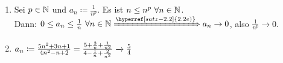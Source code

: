 \begin{beispiele*}
	\begin{enumerate}
		\item Sei $p \in \mathbb{N}$ und $a_{n} \coloneqq \frac{1}{n^{p}}$. Es ist $n \leq n^{p} ~\forall n \in \mathbb{N}$. \\
			Dann: $0 \leq a_{n} \leq \frac{1}{n} ~\forall n \in \N \xRightarrow[]{\hyperref[satz-2.2]{2.2 e)}} a_{n} \rightarrow 0$, also $\frac{1}{n^{p}} \rightarrow 0$.
		\item $a_{n} \coloneqq \frac{5n^{2} + 3n + 1}{4n^{2} - n + 2} = \frac{5 + \frac{3}{n} + \frac{1}{n{2}}}{4 - \frac{1}{n} + \frac{2}{n^{2}}} \xrightarrow[]{\label{satz-2.2}} \frac{5}{4}$ %
	\end{enumerate}
\end{beispiele*}


